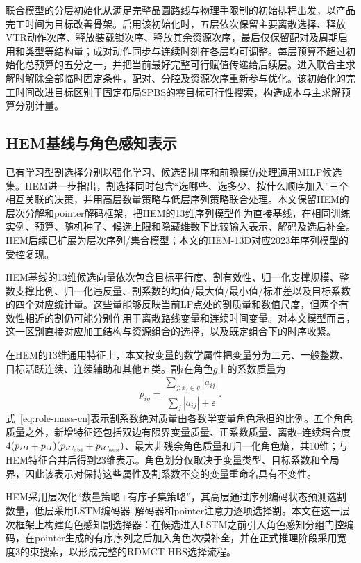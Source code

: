 \documentclass[final,5p,times,twocolumn]{elsarticle}
\begin{document}
联合模型的分层初始化从满足完整晶圆路线与物理手限制的初始排程出发，以产品完工时间为目标改善骨架。启用该初始化时，五层依次保留主要离散选择、释放VTR动作次序、释放装载锁次序、释放其余资源次序，最后仅保留配对及周期启用和类型等结构量；成对动作同步与连续时刻在各层均可调整。每层预算不超过初始化总预算的五分之一，并把当前最好完整可行赋值传递给后续层。进入联合主求解时解除全部临时固定条件，配对、分腔及资源次序重新参与优化。该初始化的完工时间改进目标区别于固定布局SPBS的零目标可行性搜索，构造成本与主求解预算分别计量。

\subsection{HEM基线与角色感知表示}

已有学习型割选择分别以强化学习、候选割排序和前瞻模仿处理通用MILP候选集\citep{tang2020cut,huang2022cutranking,paulus2022looking}。HEM进一步指出，割选择同时包含“选哪些、选多少、按什么顺序加入”三个相互关联的决策，并用高层数量策略与低层序列策略联合处理\citep{wang2023hem}。本文保留HEM的层次分解和pointer解码框架，把HEM的13维序列模型作为直接基线，在相同训练实例、预算、随机种子、候选上限和隐藏维数下比较输入表示、解码及选后补全。HEM后续已扩展为层次序列/集合模型\citep{wang2024hemset}；本文的HEM-13D对应2023年序列模型的受控复现。

HEM基线的13维候选向量依次包含目标平行度、割有效性、归一化支撑规模、整数支撑比例、归一化违反量、割系数的均值/最大值/最小值/标准差以及目标系数的四个对应统计量。这些量能够反映当前LP点处的割质量和数值尺度，但两个有效性相近的割仍可能分别作用于离散路线变量和连续时间变量。对本文模型而言，这一区别直接对应加工结构与资源组合的选择，以及既定组合下的时序收紧。

在HEM的13维通用特征上，本文按变量的数学属性把变量分为二元、一般整数、目标活跃连续、连续辅助和其他五类。割$i$在角色$g$上的系数质量为
\begin{equation}
p_{ig}=\frac{\sum_{j:x_j\in g}|a_{ij}|}{\sum_j|a_{ij}|+\varepsilon}.
\label{eq:role-mass-cn}
\end{equation}
式~\eqref{eq:role-mass-cn}表示割系数绝对质量由各数学变量角色承担的比例。五个角色质量之外，新增特征还包括双边有限界变量质量、正系数质量、离散--连续耦合度$4(p_{iB}+p_{iI})(p_{iC_{\rm obj}}+p_{iC_{\rm aux}})$、最大非残余角色质量和归一化角色熵，共10维；与HEM特征合并后得到23维表示。角色划分仅取决于变量类型、目标系数和全局界，因此该表示对保持这些属性及割系数不变的变量重命名具有不变性。

HEM采用层次化“数量策略+有序子集策略”，其高层通过序列编码状态预测选割数量，低层采用LSTM编码器--解码器和pointer注意力逐项选择割\citep{wang2023hem,vinyals2015pointer}。本文在这一层次框架上构建角色感知割选择器：在候选进入LSTM之前引入角色感知分组门控编码，在pointer生成的有序序列之后加入角色次模补全，并在正式推理阶段采用宽度3的束搜索，以形成完整的RDMCT-HBS选择流程。
\end{document}
